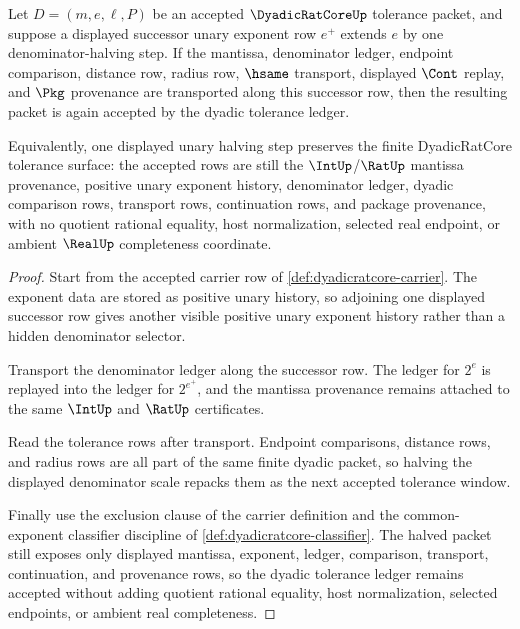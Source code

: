 \begin{theorem}
\label{thm:dyadicratcore-tolerance-halving-closure}
Let $D=(m,e,\ell,P)$ be an accepted $\DyadicRatCoreUp$ tolerance packet, and suppose a displayed successor unary exponent row $e^+$ extends $e$ by one denominator-halving step. If the mantissa, denominator ledger, endpoint comparison, distance row, radius row, $\hsame$ transport, displayed $\Cont$ replay, and $\Pkg$ provenance are transported along this successor row, then the resulting packet is again accepted by the dyadic tolerance ledger.

Equivalently, one displayed unary halving step preserves the finite DyadicRatCore tolerance surface: the accepted rows are still the $\IntUp$/$\RatUp$ mantissa provenance, positive unary exponent history, denominator ledger, dyadic comparison rows, transport rows, continuation rows, and package provenance, with no quotient rational equality, host normalization, selected real endpoint, or ambient $\RealUp$ completeness coordinate.
\end{theorem}
\begin{proof}
Start from the accepted carrier row of \autoref{def:dyadicratcore-carrier}. The exponent data are stored as positive unary history, so adjoining one displayed successor row gives another visible positive unary exponent history rather than a hidden denominator selector.

Transport the denominator ledger along the successor row. The ledger for $2^e$ is replayed into the ledger for $2^{e^+}$, and the mantissa provenance remains attached to the same $\IntUp$ and $\RatUp$ certificates.

Read the tolerance rows after transport. Endpoint comparisons, distance rows, and radius rows are all part of the same finite dyadic packet, so halving the displayed denominator scale repacks them as the next accepted tolerance window.

Finally use the exclusion clause of the carrier definition and the common-exponent classifier discipline of \autoref{def:dyadicratcore-classifier}. The halved packet still exposes only displayed mantissa, exponent, ledger, comparison, transport, continuation, and provenance rows, so the dyadic tolerance ledger remains accepted without adding quotient rational equality, host normalization, selected endpoints, or ambient real completeness.
\end{proof}

